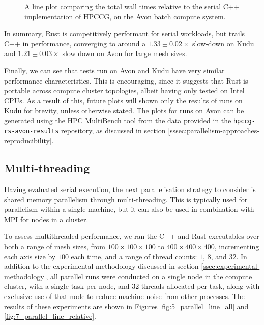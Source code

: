 \begin{figure}[H]
    \centering
    
    \caption{A line plot comparing the total wall times relative to the serial C++ implementation of HPCCG, on the Avon batch compute system.}
    \label{fig:2_serial_line_relative_avon}
\end{figure}


In summary, Rust is competitively performant for serial workloads, but trails C++ in performance, converging to around a $1.33 \pm 0.02 \times$ slow-down on Kudu and $1.21 \pm 0.03 \times$ slow down on Avon for large mesh sizes.

Finally, we can see that tests run on Avon and Kudu have very similar performance characteristics. This is encouraging, since it suggests that Rust is portable across compute cluster topologies, albeit having only tested on Intel CPUs. As a result of this, future plots will shown only the results of runs on Kudu for brevity, unless otherwise stated. The plots for runs on Avon can be generated using the HPC MultiBench tool from the data provided in the \texttt{hpccg-rs-avon-results} repository, as discussed in section \ref{sssec:parallelism-approaches-reproducibility}.

\subsection{Multi-threading}
\label{ssec:multi-threaded}

Having evaluated serial execution, the next parallelisation strategy to consider is shared memory parallelism through multi-threading. This is typically used for parallelism within a single machine, but it can also be used in combination with MPI for nodes in a cluster.

To assess multithreaded performance, we ran the C++ and Rust executables over both a range of mesh sizes, from $100 \times 100 \times 100$ to $400 \times 400 \times 400$, incrementing each axis size by $100$ each time, and a range of thread counts: $1$, $8$, and $32$. In addition to the experimental methodology discussed in section \ref{ssec:experimental-methodology}, all parallel runs were conducted on a single node in the compute cluster, with a single task per node, and 32 threads allocated per task, along with exclusive use of that node to reduce machine noise from other processes.
The results of these experiments are shown in Figures \ref{fig:5_parallel_line_all} and \ref{fig:7_parallel_line_relative}.

